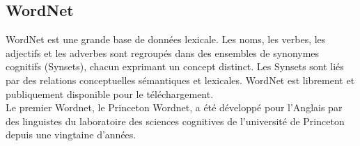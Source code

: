 
    \subsection{WordNet}
    WordNet est une grande base de données lexicale. Les noms, les verbes, les adjectifs et les adverbes sont regroupés dans des ensembles de synonymes cognitifs (Synsets), chacun exprimant un concept distinct. Les Synsets sont liés par des relations conceptuelles sémantiques et lexicales. WordNet est librement et publiquement disponible pour le téléchargement.\\
    Le premier Wordnet, le Princeton Wordnet, a été développé pour l'Anglais par des linguistes du laboratoire des sciences cognitives de l'université de Princeton depuis une vingtaine d'années.
